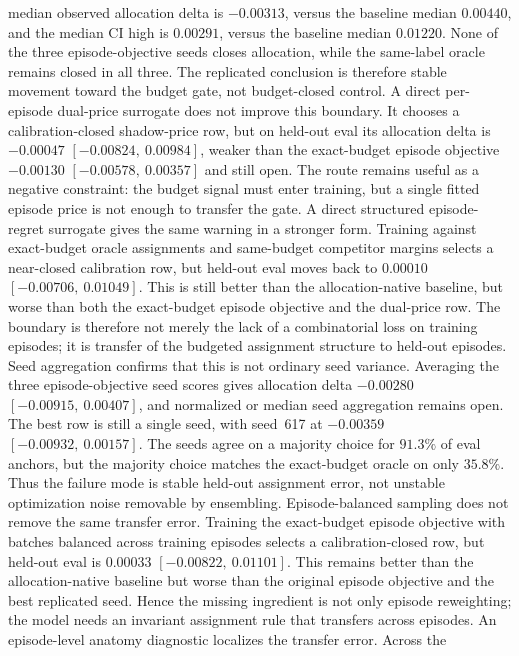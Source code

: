 median observed allocation delta is $-0.00313$, versus the baseline median
$0.00440$, and the median CI high is $0.00291$, versus the baseline median
$0.01220$.  None of the three episode-objective seeds closes allocation, while
the same-label oracle remains closed in all three.  The replicated conclusion is
therefore stable movement toward the budget gate, not budget-closed control.
A direct per-episode dual-price surrogate does not improve this boundary.  It
chooses a calibration-closed shadow-price row, but on held-out eval its
allocation delta is $-0.00047$ $[-0.00824,\ 0.00984]$, weaker than the
exact-budget episode objective $-0.00130$ $[-0.00578,\ 0.00357]$ and still open.
The route remains useful as a negative constraint: the budget signal must enter
training, but a single fitted episode price is not enough to transfer the gate.
A direct structured episode-regret surrogate gives the same warning in a
stronger form.  Training against exact-budget oracle assignments and same-budget
competitor margins selects a near-closed calibration row, but held-out eval moves
back to $0.00010$ $[-0.00706,\ 0.01049]$.  This is still better than the
allocation-native baseline, but worse than both the exact-budget episode
objective and the dual-price row.  The boundary is therefore not merely the lack
of a combinatorial loss on training episodes; it is transfer of the budgeted
assignment structure to held-out episodes.
Seed aggregation confirms that this is not ordinary seed variance.  Averaging
the three episode-objective seed scores gives allocation delta $-0.00280$
$[-0.00915,\ 0.00407]$, and normalized or median seed aggregation remains open.
The best row is still a single seed, with seed~617 at $-0.00359$
$[-0.00932,\ 0.00157]$.  The seeds agree on a majority choice for $91.3\%$ of
eval anchors, but the majority choice matches the exact-budget oracle on only
$35.8\%$.  Thus the failure mode is stable held-out assignment error, not
unstable optimization noise removable by ensembling.
Episode-balanced sampling does not remove the same transfer error.  Training
the exact-budget episode objective with batches balanced across training
episodes selects a calibration-closed row, but held-out eval is $0.00033$
$[-0.00822,\ 0.01101]$.  This remains better than the allocation-native
baseline but worse than the original episode objective and the best replicated
seed.  Hence the missing ingredient is not only episode reweighting; the model
needs an invariant assignment rule that transfers across episodes.
An episode-level anatomy diagnostic localizes the transfer error.  Across the

